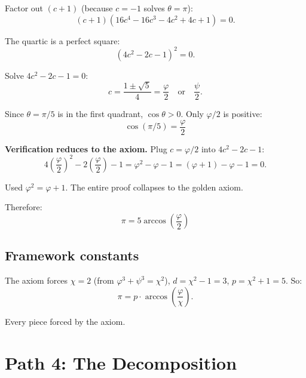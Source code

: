 \documentclass[11pt,a4paper]{article}
\theoremstyle{plain}
\theoremstyle{definition}
\newcommand{\vp}{\varphi}
\begin{document}
Factor out $(c + 1)$ (because $c = -1$ solves $\theta = \pi$):
\begin{equation}
  (c + 1)(16c^4 - 16c^3 - 4c^2 + 4c + 1) = 0.
\end{equation}

The quartic is a perfect square:
\begin{equation}
  (4c^2 - 2c - 1)^2 = 0.
\end{equation}

Solve $4c^2 - 2c - 1 = 0$:
\begin{equation}
  c = \frac{1 \pm \sqrt{5}}{4} = \frac{\vp}{2} \quad \text{or} \quad \frac{\psi}{2}.
\end{equation}

Since $\theta = \pi/5$ is in the first quadrant, $\cos\theta > 0$. Only $\vp/2$ is positive:
\begin{equation}\label{eq:cos-pi5}
  \boxed{\; \cos(\pi/5) = \frac{\vp}{2} \;}
\end{equation}

\textbf{Verification reduces to the axiom.} Plug $c = \vp/2$ into $4c^2 - 2c - 1$:
\begin{equation}
  4\left(\frac{\vp}{2}\right)^{\!2} - 2\left(\frac{\vp}{2}\right) - 1
  = \vp^2 - \vp - 1 = (\vp + 1) - \vp - 1 = 0.
\end{equation}

Used $\vp^2 = \vp + 1$. The entire proof collapses to the golden axiom.

Therefore:
\begin{equation}\label{eq:pi-golden}
  \boxed{\; \pi = 5\arccos\!\left(\frac{\vp}{2}\right) \;}
\end{equation}

\subsection{Framework constants}

The axiom forces $\chi = 2$ (from $\vp^3 + \psi^3 = \chi^2$),
$d = \chi^2 - 1 = 3$, $p = \chi^2 + 1 = 5$. So:
\begin{equation}
  \pi = p \cdot \arccos\!\left(\frac{\vp}{\chi}\right).
\end{equation}

Every piece forced by the axiom.

\section{Path 4: The Decomposition}
\end{document}
